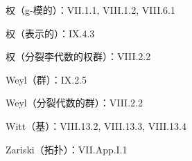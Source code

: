 权（g-模的）：VII.1.1, VIII.1.2, VIII.6.1

权（表示的）：IX.4.3

权（分裂李代数的权群）：VIII.2.2

Weyl（群）：IX.2.5

Weyl（分裂代数的群）：VIII.2.2

Witt（基）：VIII.13.2, VIII.13.3, VIII.13.4

Zariski（拓扑）：VII.App.I.1